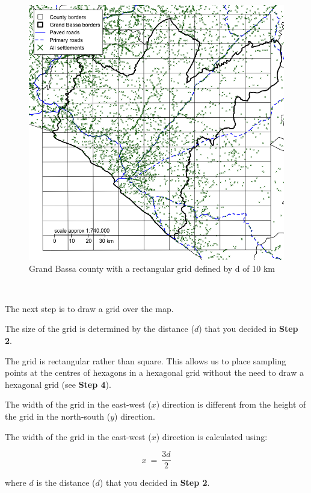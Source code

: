 \documentclass[12pt,a4paper]{book}
\theoremstyle{definition}
\theoremstyle{definition}
\theoremstyle{definition}
\theoremstyle{remark}
\begin{document}
\begin{figure}[H]

{\centering \includegraphics{figures/grid1a-1} 

}

\caption{Grand Bassa county with a rectangular grid defined by d of 10 km}\label{fig:grid1a}
\end{figure}

~

The next step is to draw a grid over the map.

The size of the grid is determined by the distance (\(d\)) that you
decided in \textbf{Step 2}.

The grid is rectangular rather than square. This allows us to place
sampling points at the centres of hexagons in a hexagonal grid without
the need to draw a hexagonal grid (see \textbf{Step 4}).

The width of the grid in the east-west (\(x\)) direction is different
from the height of the grid in the north-south (\(y\)) direction.

The width of the grid in the east-west (\(x\)) direction is calculated
using:

\[ x ~ = ~ \frac{3d}{2} \]

where \(d\) is the distance (\(d\)) that you decided in \textbf{Step 2}.
\end{document}
